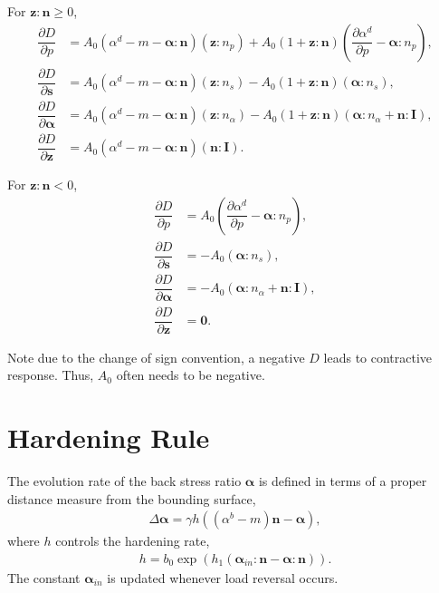 \documentclass[11pt,a4paper]{article}
\newcommand*{\pfrac}[2]{\dfrac{\partial#1}{\partial#2}}
\begin{document}
For $\mathbold{z}:\mathbold{n}\geqslant0$,
\begin{align}
\pfrac{D}{p}&=A_0\left(\alpha^d-m-\mathbold{\alpha}:\mathbold{n}\right)\left(\mathbold{z}:n_p\right)+A_0\left(1+\mathbold{z}:\mathbold{n}\right)\left(\pfrac{\alpha^d}{p}-\mathbold{\alpha}:n_p\right),\\
\pfrac{D}{\mathbold{s}}&=A_0\left(\alpha^d-m-\mathbold{\alpha}:\mathbold{n}\right)\left(\mathbold{z}:n_s\right)-A_0\left(1+\mathbold{z}:\mathbold{n}\right)\left(\mathbold{\alpha}:n_s\right),\\
\pfrac{D}{\mathbold{\alpha}}&=A_0\left(\alpha^d-m-\mathbold{\alpha}:\mathbold{n}\right)\left(\mathbold{z}:n_\alpha\right)-A_0\left(1+\mathbold{z}:\mathbold{n}\right)\left(\mathbold{\alpha}:n_\alpha+\mathbold{n}:\mathbf{I}\right),\\
\pfrac{D}{\mathbold{z}}&=A_0\left(\alpha^d-m-\mathbold{\alpha}:\mathbold{n}\right)\left(\mathbold{n}:\mathbf{I}\right).
\end{align}

For $\mathbold{z}:\mathbold{n}<0$,
\begin{align}
\pfrac{D}{p}&=A_0\left(\pfrac{\alpha^d}{p}-\mathbold{\alpha}:n_p\right),\\
\pfrac{D}{\mathbold{s}}&=-A_0\left(\mathbold{\alpha}:n_s\right),\\
\pfrac{D}{\mathbold{\alpha}}&=-A_0\left(\mathbold{\alpha}:n_\alpha+\mathbold{n}:\mathbf{I}\right),\\
\pfrac{D}{\mathbold{z}}&=\mathbold{0}.
\end{align}

Note due to the change of sign convention, a negative $D$ leads to contractive response. Thus, $A_0$ often needs to be negative.
\section{Hardening Rule}
The evolution rate of the back stress ratio $\mathbold{\alpha}$ is defined in terms of a proper distance measure from the bounding surface,
\begin{gather}
\Delta\mathbold{\alpha}=\gamma{}h\left(\left(\alpha^b-m\right)\mathbold{n}-\mathbold{\alpha}\right),
\end{gather}
where $h$ controls the hardening rate,
\begin{gather}
h=b_0\exp\left(h_1\left(\mathbold{\alpha}_{in}:\mathbold{n}-\mathbold{\alpha}:\mathbold{n}\right)\right).
\end{gather}
The constant $\mathbold{\alpha}_{in}$ is updated whenever load reversal occurs.
\end{document}
